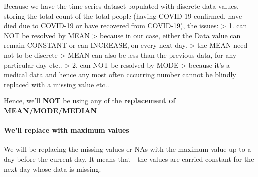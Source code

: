 \documentclass[11pt]{article}
\begin{document}
    Because we have the time-series dataset populated with discrete data
values, storing the total count of the total people (having COVID-19
confirmed, have died due to COVID-19 or have recovered from COVID-19),
the issues: \textgreater{} 1. can NOT be resolved by MEAN \textgreater{}
because in our case, either the Data value can remain CONSTANT or can
INCREASE, on every next day. \textgreater{} the MEAN need not to be
discrete \textgreater{} MEAN can also be less than the previous data,
for any particular day etc.. \textgreater{} 2. can NOT be resolved by
MODE \textgreater{} because it's a medical data and hence any most often
occurring number cannot be blindly replaced with a missing value etc..

Hence, we'll \textbf{NOT} be using any of the \textbf{replacement of
MEAN/MODE/MEDIAN}

    \hypertarget{well-replace-with-maximum-values}{%
\paragraph{We'll replace with maximum
values}\label{well-replace-with-maximum-values}}

We will be replacing the missing values or NAs with the maximum value up
to a day before the current day. It means that - the values are carried
constant for the next day whose data is missing.
\end{document}
